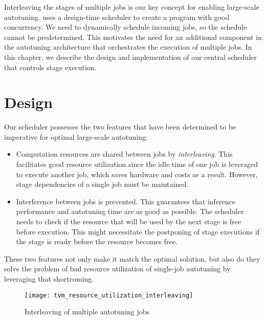 Interleaving the stages of multiple jobs is our key concept for enabling large-scale autotuning. \cite{Ma.2005} uses a design-time scheduler to create a program with good concurrency. We need to dynamically schedule incoming jobs, so the schedule cannot be predetermined. This motivates the need for an additional component in the autotuning architecture that orchestrates the execution of multiple jobs. In this chapter, we describe the design and implementation of our central scheduler that controls stage execution.

\section{Design}
Our scheduler possesses the two features that have been determined to be imperative for optimal large-scale autotuning:
\begin{itemize}
	\item Computation resources are shared between jobs by \textit{interleaving}. This facilitates good resource utilization since the idle time of one job is leveraged to execute another job, which saves hardware and costs as a result. However, stage dependencies of a single job must be maintained.
	\item Interference between jobs is prevented. This guarantees that inference performance and autotuning time are as good as possible. The scheduler needs to check if the resource that will be used by the next stage is free before execution. This might necessitate the postponing of stage executions if the stage is ready before the resource becomes free.
\end{itemize}
These two features not only make it match the optimal solution, but also do they solve the problem of bad resource utilization of single-job autotuning by leveraging that shortcoming.

\begin{figure}[h]
	\centering
	\texttt{[image: tvm\_resource\_utilization\_interleaving]}%
	\caption{Interleaving of multiple autotuning jobs}
	\label{fig:interleaving}
\end{figure}

